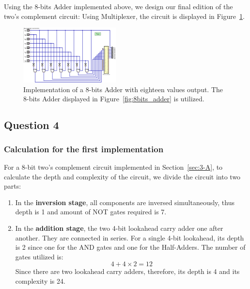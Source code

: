 \documentclass[conference]{IEEEtran}
\begin{document}
Using the 8-bits Adder implemented above, we design our final edition of the two's complement circuit: Using Multiplexer, the circuit is displayed in Figure~\ref{fig:twos_complement_course}.


\begin{figure}[h!]
\centering
\includegraphics[width=0.45\textwidth]{assets/twos_complement_course.png}
\caption{Implementation of a 8-bits Adder with eighteen values output. The 8-bits Adder displayed in Figure~\ref{fig:8bits_adder} is utilized.}
\label{fig:twos_complement_course}
\end{figure}


    
\subsection{Question 4}

\subsubsection{Calculation for the first implementation}\label{sec:q4}


For a 8-bit two's complement circuit implemented in Section~\ref{sec:3-A}, to calculate the depth and complexity of the circuit, we divide the circuit into two parts:
\begin{enumerate}
    \item In the \textbf{inversion stage}, all components are inversed simultaneously, thus depth is 1 and amount of NOT gates required is 7.
    \item In the \textbf{addition stage}, the two 4-bit lookahead carry adder one after another. They are connected in series.
          For a single 4-bit lookahead, its depth is 2 since one for the AND gates and one for the Half-Adders. The number of gates utilized is:
          \begin{equation}
            4 +4 \times 2 = 12
          \end{equation}
          Since there are two lookahead carry adders, therefore, its depth is 4 and its complexity is 24.

\end{enumerate}
\end{document}

